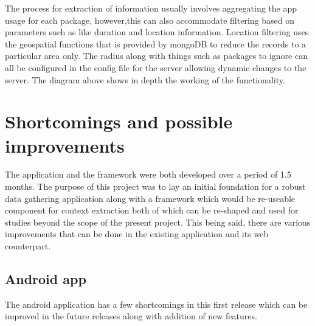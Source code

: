 \documentclass[12pt]{report}
\begin{document}
The process for extraction of information usually involves aggregating the app usage for each package, however,this can also accommodate filtering based on parameters such as like duration and location information. Location filtering uses the geospatial functions that is provided by mongoDB to reduce the records to a particular area only. The radius along with things such as packages to ignore can all be configured in the config file for the server allowing dynamic changes to the server. The diagram above shows in depth the working of the functionality.

\section{Shortcomings and possible improvements}
\label{AndroidShortcoming}
The application and the framework were both developed over a period of 1.5 months. The purpose of this project was to lay an initial foundation for a robust data gathering application along with a framework which would be re-useable component for context extraction both of which can be re-shaped and used for studies beyond the scope of the present project. This being said, there are various improvements that can be done in the existing application and its web counterpart.

\subsection{Android app}

The android application has a few shortcomings in this first release which can be improved in the future releases along with addition of new features. 
\end{document}
